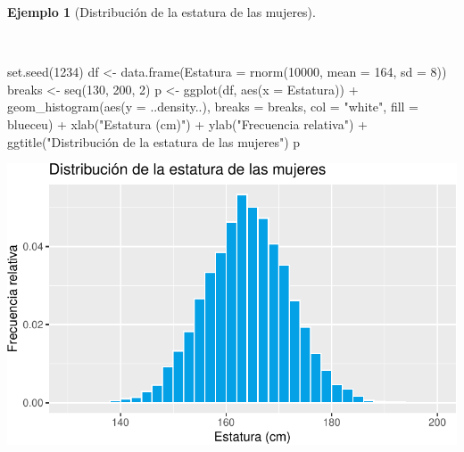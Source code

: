 \documentclass[
  a4paper,
]{scrreport}
\newenvironment{Shaded}{\begin{snugshade}}{\end{snugshade}}
\newcommand{\AttributeTok}[1]{\textcolor[rgb]{0.40,0.45,0.13}{#1}}
\newcommand{\DecValTok}[1]{\textcolor[rgb]{0.68,0.00,0.00}{#1}}
\newcommand{\FunctionTok}[1]{\textcolor[rgb]{0.28,0.35,0.67}{#1}}
\newcommand{\NormalTok}[1]{\textcolor[rgb]{0.00,0.23,0.31}{#1}}
\newcommand{\OtherTok}[1]{\textcolor[rgb]{0.00,0.23,0.31}{#1}}
\newcommand{\SpecialCharTok}[1]{\textcolor[rgb]{0.37,0.37,0.37}{#1}}
\newcommand{\StringTok}[1]{\textcolor[rgb]{0.13,0.47,0.30}{#1}}
\theoremstyle{plain}
\theoremstyle{definition}
\theoremstyle{definition}
\newtheorem{example}{Ejemplo}[chapter]
\theoremstyle{remark}
\begin{document}
\begin{example}[Distribución de la estatura de las
mujeres]\protect\hypertarget{exm-distribucion-estatura-mujeres}{}\label{exm-distribucion-estatura-mujeres}

~

\begin{Shaded}
\begin{Highlighting}[]
\FunctionTok{set.seed}\NormalTok{(}\DecValTok{1234}\NormalTok{)}
\NormalTok{df }\OtherTok{\textless{}{-}} \FunctionTok{data.frame}\NormalTok{(}\AttributeTok{Estatura =} \FunctionTok{rnorm}\NormalTok{(}\DecValTok{10000}\NormalTok{, }\AttributeTok{mean =} \DecValTok{164}\NormalTok{, }\AttributeTok{sd =} \DecValTok{8}\NormalTok{))}
\NormalTok{breaks }\OtherTok{\textless{}{-}} \FunctionTok{seq}\NormalTok{(}\DecValTok{130}\NormalTok{, }\DecValTok{200}\NormalTok{, }\DecValTok{2}\NormalTok{)}
\NormalTok{p }\OtherTok{\textless{}{-}} \FunctionTok{ggplot}\NormalTok{(df, }\FunctionTok{aes}\NormalTok{(}\AttributeTok{x =}\NormalTok{ Estatura)) }\SpecialCharTok{+}
    \FunctionTok{geom\_histogram}\NormalTok{(}\FunctionTok{aes}\NormalTok{(}\AttributeTok{y =}\NormalTok{ ..density..), }\AttributeTok{breaks =}\NormalTok{ breaks, }\AttributeTok{col =} \StringTok{"white"}\NormalTok{, }\AttributeTok{fill =}\NormalTok{ blueceu) }\SpecialCharTok{+}
    \FunctionTok{xlab}\NormalTok{(}\StringTok{"Estatura (cm)"}\NormalTok{) }\SpecialCharTok{+}
    \FunctionTok{ylab}\NormalTok{(}\StringTok{"Frecuencia relativa"}\NormalTok{) }\SpecialCharTok{+}
    \FunctionTok{ggtitle}\NormalTok{(}\StringTok{"Distribución de la estatura de las mujeres"}\NormalTok{)}
\NormalTok{p}
\end{Highlighting}
\end{Shaded}

\includegraphics{02-estadistica-descriptiva_files/figure-pdf/histograma-estatura-mujeres-1.pdf}

\end{example}
\end{document}

